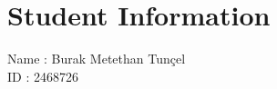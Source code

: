 \documentclass[12pt]{article}
\begin{document}

\section*{Student Information}

Name : Burak Metethan Tunçel\\

ID : 2468726\\








\end{document}
